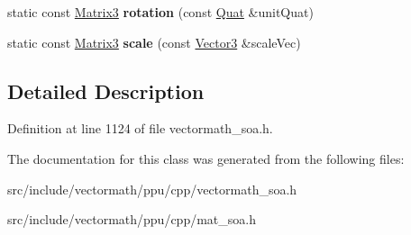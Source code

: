 \begin{DoxyCompactItemize}
\item 
\hypertarget{classVectormath_1_1Soa_1_1Matrix3_a59e44ca55c4d225c57d9fdebf767450c}{static const \hyperlink{classVectormath_1_1Soa_1_1Matrix3}{Matrix3} {\bfseries rotation} (const \hyperlink{classVectormath_1_1Soa_1_1Quat}{Quat} \&unit\-Quat)}\label{classVectormath_1_1Soa_1_1Matrix3_a59e44ca55c4d225c57d9fdebf767450c}

\item 
\hypertarget{classVectormath_1_1Soa_1_1Matrix3_a4a0f7c2f8410a97db5f66f1ca42f536f}{static const \hyperlink{classVectormath_1_1Soa_1_1Matrix3}{Matrix3} {\bfseries scale} (const \hyperlink{classVectormath_1_1Soa_1_1Vector3}{Vector3} \&scale\-Vec)}\label{classVectormath_1_1Soa_1_1Matrix3_a4a0f7c2f8410a97db5f66f1ca42f536f}

\end{DoxyCompactItemize}


\subsection{Detailed Description}


Definition at line 1124 of file vectormath\-\_\-soa.\-h.



The documentation for this class was generated from the following files\-:\begin{DoxyCompactItemize}
\item 
src/include/vectormath/ppu/cpp/vectormath\-\_\-soa.\-h\item 
src/include/vectormath/ppu/cpp/mat\-\_\-soa.\-h\end{DoxyCompactItemize}
